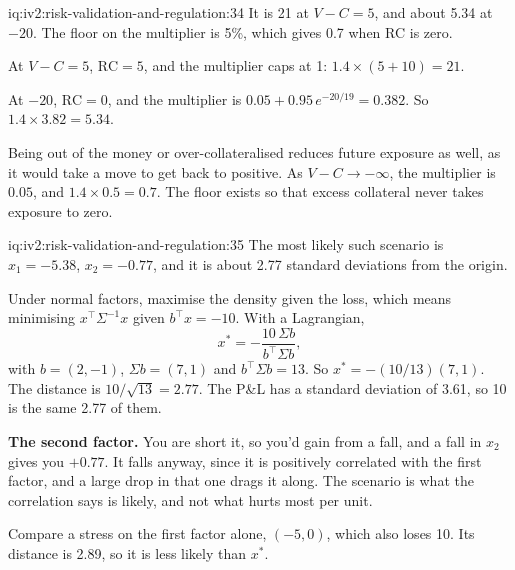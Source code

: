 \begin{solution}{iq:iv2:risk-validation-and-regulation:34}
It is 21 at $V - C = 5$, and about 5.34 at $-20$. The floor on the multiplier is 5\%, which gives 0.7 when RC is zero.

At $V - C = 5$, $\mathrm{RC} = 5$, and the multiplier caps at 1: $1.4 \times (5 + 10) = 21$.

At $-20$, $\mathrm{RC} = 0$, and the multiplier is $0.05 + 0.95\,e^{-20/19} = 0.382$. So $1.4 \times 3.82 = 5.34$.

Being out of the money or over-collateralised reduces future exposure as well, as it would take a move to get back to positive. As $V - C \to -\infty$, the multiplier is $0.05$, and $1.4 \times 0.5 = 0.7$. The floor exists so that excess collateral never takes exposure to zero.

\end{solution}

\begin{solution}{iq:iv2:risk-validation-and-regulation:35}
The most likely such scenario is $x_1 = -5.38$, $x_2 = -0.77$, and it is about 2.77 standard deviations from the origin.

Under normal factors, maximise the density given the loss, which means minimising $x^\top\Sigma^{-1}x$ given $b^\top x = -10$. With a Lagrangian,
\[
x^* = -\frac{10\,\Sigma b}{b^\top\Sigma b},
\]
with $b = (2, -1)$, $\Sigma b = (7, 1)$ and $b^\top\Sigma b = 13$. So $x^* = -(10/13)(7, 1)$. The distance is $10/\sqrt{13} = 2.77$. The P\&L has a standard deviation of 3.61, so 10 is the same 2.77 of them.

\textbf{The second factor.} You are short it, so you'd gain from a fall, and a fall in $x_2$ gives you $+0.77$. It falls anyway, since it is positively correlated with the first factor, and a large drop in that one drags it along. The scenario is what the correlation says is likely, and not what hurts most per unit.

Compare a stress on the first factor alone, $(-5, 0)$, which also loses 10. Its distance is 2.89, so it is less likely than $x^*$.

\end{solution}

